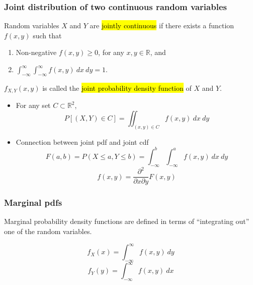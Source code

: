 \documentclass[slidestop,compress,mathserif]{beamer}
\begin{document}
\begin{frame}
\frametitle{Joint distribution of two continuous random variables}

\vspace{-0.2cm}
\begin{defn}
Random variables $X$ and $Y$ are \hl{jointly continuous} if there exists a function $f(x, y)$ such that
\begin{enumerate}
\item Non-negative $f(x, y) \geq 0$, for any $x, y \in \mathbb{R}$, and
\item $\int_{-\infty}^{\infty} \int_{-\infty}^{\infty} f(x,y) ~dx~dy = 1$.
\end{enumerate}
$f_{X, Y}(x, y)$ is called the \hl{joint probability density function} of $X$ and $Y$.
\end{defn}
\vspace{-0.2cm}

\begin{itemize}
\item \pause
For any set $C \subset \mathbb{R}^2$,
\[ P[(X, Y) \in C] = \iint_{(x, y) \in C} f(x,y) ~dx~dy\]
\vspace{-0.2cm}
\item \pause
Connection between joint pdf and joint cdf
\vspace{-0.2cm}
\[ F(a,b) = P(X\leq a,Y\leq b) = \int_{-\infty}^b \int_{-\infty}^a f(x,y) ~dx~dy \] \pause \vspace{-0.2cm}
\[f(x,y) = \frac{\partial^2}{\partial x \partial y} F(x,y)\]

\end{itemize}


\end{frame}


\begin{frame}
\frametitle{Marginal pdfs}

Marginal probability density functions are defined in terms of ``integrating out'' one of the random variables.

\[ f_X(x) = \int_{-\infty}^\infty f(x,y)~dy \]
\[ f_Y(y) = \int_{-\infty}^\infty f(x,y)~dx \]


\end{frame}
\end{document}
